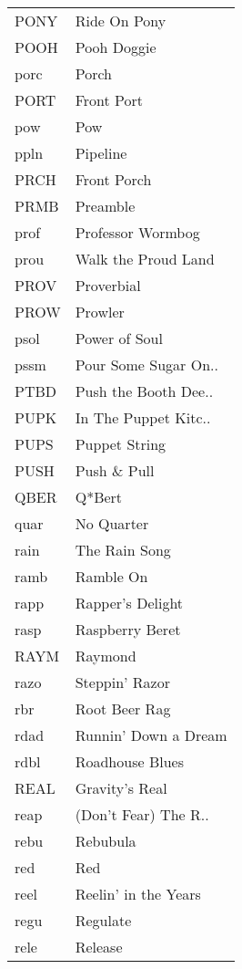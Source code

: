 \begin{supertabular}{ll}
 PONY &          Ride On Pony \\
 POOH &           Pooh Doggie \\
 porc &                 Porch \\
 PORT &            Front Port \\
  pow &                   Pow \\
 ppln &              Pipeline \\
 PRCH &           Front Porch \\
 PRMB &              Preamble \\
 prof &     Professor Wormbog \\
 prou &   Walk the Proud Land \\
 PROV &            Proverbial \\
 PROW &               Prowler \\
 psol &         Power of Soul \\
 pssm &  Pour Some Sugar On.. \\
 PTBD &  Push the Booth Dee.. \\
 PUPK &  In The Puppet Kitc.. \\
 PUPS &         Puppet String \\
 PUSH &           Push \& Pull \\
 QBER &                Q*Bert \\
 quar &            No Quarter \\
 rain &         The Rain Song \\
 ramb &             Ramble On \\
 rapp &      Rapper's Delight \\
 rasp &       Raspberry Beret \\
 RAYM &               Raymond \\
 razo &        Steppin' Razor \\
  rbr &         Root Beer Rag \\
 rdad &  Runnin' Down a Dream \\
 rdbl &       Roadhouse Blues \\
 REAL &        Gravity's Real \\
 reap &  (Don't Fear) The R.. \\
 rebu &              Rebubula \\
  red &                   Red \\
 reel &  Reelin' in the Years \\
 regu &              Regulate \\
 rele &               Release \\

\end{supertabular}
